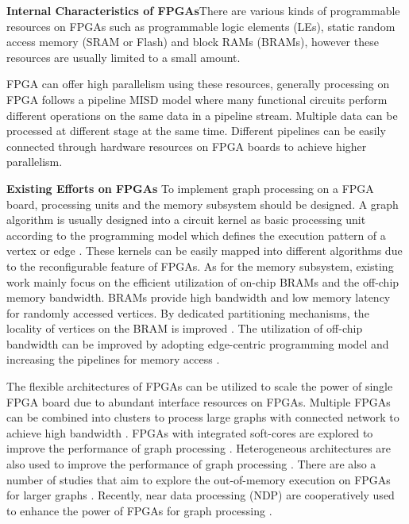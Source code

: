 \documentclass[twoside]{article}
\begin{document}
\begin{multicols}{2}
{\bf Internal Characteristics of FPGAs}\quad There are various kinds of programmable resources on FPGAs such as  programmable logic elements (LEs), static random access memory (SRAM or Flash) and block RAMs (BRAMs), however these resources are usually limited to a small amount.

FPGA can offer high parallelism using these resources, generally  processing on FPGA follows a pipeline MISD model where many functional circuits perform different operations on the same data in a pipeline stream. Multiple data can be processed at different stage at the same time. Different pipelines can be easily connected through hardware resources on FPGA boards to achieve higher parallelism. 

{\bf Existing Efforts on FPGAs}\quad 
To implement graph processing on a FPGA board, processing units and the memory subsystem should be designed. A graph algorithm is usually designed into a circuit kernel as basic processing unit according to the programming model which defines the execution pattern of a vertex or edge \cite{betkaoui2012ssspbrain, Zhou2018fastcf}. These kernels can be easily mapped into different algorithms due to the reconfigurable feature of FPGAs. As for the memory subsystem, existing work mainly focus on the efficient utilization of on-chip BRAMs and the off-chip memory bandwidth. BRAMs provide high bandwidth and low memory latency for randomly accessed vertices. By dedicated partitioning mechanisms, the locality of vertices on the BRAM is improved \cite{Dai2016fpgp, Dai2017foregraph, Zhang2018degreebfsfpga}. The utilization of off-chip bandwidth can be improved by adopting edge-centric programming model and increasing the pipelines for memory access \cite{zhou2016highthroughput}.

The flexible architectures of FPGAs can be utilized to scale the power of single FPGA board due to abundant interface resources on FPGAs. Multiple FPGAs can be combined into clusters to process large graphs with connected network to achieve high bandwidth \cite{Zhang2017fpgahmcbfs, attia2014cygraph}. FPGAs with integrated soft-cores are explored to improve the performance of graph processing \cite{kapre2015softcorefpga}. Heterogeneous architectures are also used to improve the performance of graph processing \cite{zhou2017cpufpga}. There are also a number of studies that aim to explore the out-of-memory execution on FPGAs for larger graphs \cite{Dai2016fpgp, Dai2017foregraph}. Recently, near data processing (NDP) are cooperatively used to enhance the power of FPGAs for graph processing \cite{Khoram2018fpgaco-optimizinghmc,Zhang2017fpgahmcbfs,JUN2018GRAFBOOST}.





\end{multicols}
\end{document}
